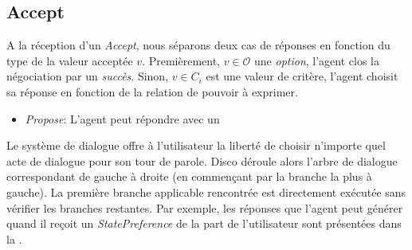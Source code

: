 	
		\subsection{Accept }
			A la réception	d'un \emph{Accept}, nous séparons deux cas de réponses en fonction du type de la valeur acceptée $v$.
			Premièrement, $ v \in \mathcal{O}$ une \textit{option}, l'agent clos la négociation par un \emph{succès}.
			Sinon, $v \in C_i$ est une valeur de critère, l'agent choisit sa réponse en fonction de la relation de pouvoir à exprimer.
			
			\begin{itemize}
				\item \emph{Propose}: L'agent peut répondre avec un
			\end{itemize}
			
				
			Le système de dialogue offre à l'utilisateur la liberté de choisir n'importe quel acte de dialogue pour son tour de parole. Disco déroule alors l'arbre de dialogue correspondant de gauche à droite (en commençant par la branche la plus à gauche). La première branche applicable rencontrée est directement exécutée sans vérifier les branches restantes.
		Par exemple, les réponses que l'agent peut générer quand il reçoit un \emph{StatePreference} de la part de l'utilisateur sont présentées dans la .
	
	
	
	